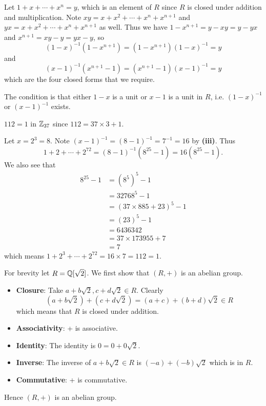 \begin{questions}
    \item \begin{partquestions}{\roman*}
        \item Let $1 + x + \cdots + x^n = y$, which is an element of $R$ since $R$ is closed under addition and multiplication. Note $xy = x + x^2 + \cdots + x^n + x^{n+1}$ and $yx = x + x^2 + \cdots + x^n + x^{n+1}$ as well. Thus we have $1 - x^{n+1} = y - xy = y - yx$ and $x^{n+1} = xy - y = yx - y$, so
        \[
            (1-x)^{-1}(1-x^{n+1}) = (1-x^{n+1})(1-x)^{-1} = y
        \]
        and
        \[
            (x-1)^{-1}(x^{n+1}-1) = (x^{n+1}-1)(x-1)^{-1} = y
        \]
        which are the four closed forms that we require.
        \item The condition is that either $1-x$ is a unit or $x-1$ is a unit in $R$, i.e. $(1-x)^{-1}$ or $(x-1)^{-1}$ exists.
        \item $112 = 1$ in $\mathbb{Z}_{37}$ since $112 = 37\times3 + 1$.
        \item Let $x = 2^3 = 8$. Note $(x-1)^{-1} = (8-1)^{-1} = 7^{-1} = 16$ by \textbf{(iii)}. Thus
        \[
            1+2+\cdots+2^{72} = (8-1)^{-1}(8^{25}-1) = 16(8^{25}-1).
        \]
        We also see that
        \begin{align*}
            8^{25}-1 &= \left(8^{5}\right)^{5} - 1\\
            &= 32768^5 - 1\\
            &= (37\times885 + 23)^5 - 1\\
            &= (23)^5 - 1\\
            &= 6436342\\
            &= 37\times173955 + 7\\
            &= 7
        \end{align*}
        which means $1+2^3+\cdots+2^{72} = 16 \times 7 = 112 = 1$.
    \end{partquestions}

    \item For brevity let $R = \mathbb{Q}[\sqrt2]$. We first show that $(R,+)$ is an abelian group.
    \begin{itemize}
        \item \textbf{Closure}: Take $a+b\sqrt2, c+d\sqrt2 \in R$. Clearly
        \[
            (a+b\sqrt2) + (c+d\sqrt2) = (a+c) + (b+d)\sqrt2 \in R
        \]
        which means that $R$ is closed under addition.
        \item \textbf{Associativity}: + is associative.
        \item \textbf{Identity}: The identity is $0 = 0 + 0\sqrt2$.
        \item \textbf{Inverse}: The inverse of $a+b\sqrt2 \in R$ is $(-a) + (-b)\sqrt2$ which is in $R$.
        \item \textbf{Commutative}: + is commutative.
    \end{itemize}
    Hence $(R, +)$ is an abelian group.


\end{questions}
